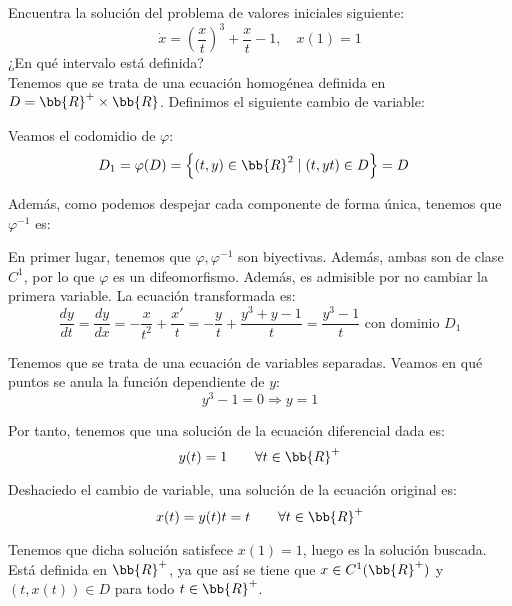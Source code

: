 \documentclass[12pt]{article}
\begin{document}
\begin{ejercicio}
    Encuentra la solución del problema de valores iniciales siguiente:
    \begin{equation*}
        \dot{x} = \left(\dfrac{x}{t}\right)^3 + \dfrac{x}{t} - 1, \quad x(1) = 1
    \end{equation*}
    ¿En qué intervalo está definida?\\

    Tenemos que se trata de una ecuación homogénea definida en $D=\bb{R}^+\times \bb{R}$. Definimos el siguiente cambio de variable:

    Veamos el codomidio de $\varphi$:
    \begin{align*}
        D_1=\varphi(D) &= \left\{(t, y)\in\bb{R}^2 \mid (t,yt)\in D\right\}=D
    \end{align*}    

    Además, como podemos despejar cada componente de forma única, tenemos que $\varphi^{-1}$ es:

    En primer lugar, tenemos que $\varphi,\varphi^{-1}$ son biyectivas. Además, ambas son de clase $C^1$, por lo que $\varphi$ es un difeomorfismo.
    Además, es admisible por no cambiar la primera variable. La ecuación transformada es:
    \begin{equation*}
        \dfrac{dy}{dt} = \dfrac{dy}{dx}=-\dfrac{x}{t^2} +\dfrac{x'}{t} = -\frac{y}{t} + \dfrac{y^3+y-1}{t} = \dfrac{y^3-1}{t} \text{ con dominio } D_1
    \end{equation*}

    Tenemos que se trata de una ecuación de variables separadas. Veamos en qué puntos se anula la función dependiente de $y$:
    \begin{equation*}
        y^3-1=0 \Longrightarrow y=1
    \end{equation*}

    Por tanto, tenemos que una solución de la ecuación diferencial dada es:
    \begin{equation*}
        y(t)=1\qquad \forall t\in \bb{R}^+
    \end{equation*}

    Deshaciedo el cambio de variable, una solución de la ecuación original es:
    \begin{equation*}
        x(t)=y(t)t = t \qquad \forall t\in \bb{R}^+
    \end{equation*}

    Tenemos que dicha solución satisfece $x(1)=1$, luego es la solución buscada. Está definida en $\bb{R}^+$, ya que así se tiene que $x\in C^1(\bb{R}^+)$ y $(t,x(t))\in D$ para todo $t\in \bb{R}^+$.
\end{ejercicio}
\end{document}
